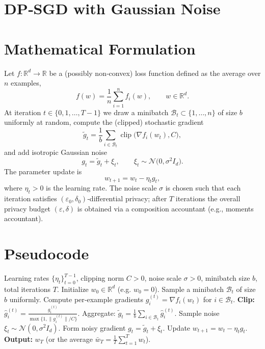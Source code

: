 \documentclass{article}
\newcommand{\R}{\mathbb{R}}
\begin{document}
\section*{DP‑SGD with Gaussian Noise}

\section*{Mathematical Formulation}
Let $f:\R^{d}\to\R$ be a (possibly non‑convex) loss function defined as the average over $n$ examples,
\[
f(w)=\frac{1}{n}\sum_{i=1}^{n} f_i(w),\qquad w\in\R^{d}.
\]
At iteration $t\in\{0,1,\dots,T-1\}$ we draw a minibatch $\mathcal{B}_t\subset\{1,\dots,n\}$ of size $b$ uniformly at random,
compute the (clipped) stochastic gradient
\[
\tilde g_t=\frac{1}{b}\sum_{i\in\mathcal{B}_t}\operatorname{clip}\!\bigl(\nabla f_i(w_t),C\bigr),
\]
and add isotropic Gaussian noise
\[
g_t=\tilde g_t+ \xi_t,\qquad \xi_t\sim\mathcal N\!\bigl(0,\sigma^{2}I_d\bigr).
\]
The parameter update is
\[
w_{t+1}=w_t-\eta_t g_t,
\]
where $\eta_t>0$ is the learning rate.  
The noise scale $\sigma$ is chosen such that each iteration satisfies $(\varepsilon_0,\delta_0)$‑differential privacy; after $T$ iterations the overall privacy budget $(\varepsilon,\delta)$ is obtained via a composition accountant (e.g., moments accountant).

\section*{Pseudocode}
\begin{algorithm}[H]
\caption{DP‑SGD with Gaussian Noise}
\begin{algorithmic}[1]
\Require Learning rates $\{\eta_t\}_{t=0}^{T-1}$, clipping norm $C>0$, noise scale $\sigma>0$, minibatch size $b$, total iterations $T$.
\State Initialize $w_0\in\R^{d}$ (e.g. $w_0=0$).
    \State Sample a minibatch $\mathcal{B}_t$ of size $b$ uniformly.
    \State Compute per‑example gradients $g_i^{(t)}=\nabla f_i(w_t)$ for $i\in\mathcal{B}_t$.
    \State \textbf{Clip:} $\displaystyle \hat g_i^{(t)}=
          \frac{g_i^{(t)}}{\max\{1,\|g_i^{(t)}\|/C\}}$.
    \State Aggregate: $\displaystyle \tilde g_t=\frac{1}{b}\sum_{i\in\mathcal{B}_t}\hat g_i^{(t)}$.
    \State Sample noise $\xi_t\sim\mathcal N(0,\sigma^{2}I_d)$.
    \State Form noisy gradient $g_t=\tilde g_t+\xi_t$.
    \State Update $w_{t+1}=w_t-\eta_t g_t$.
\EndFor
\State \textbf{Output:} $w_T$ (or the average $\bar w_T=\frac1T\sum_{t=1}^{T}w_t$).
\end{algorithmic}
\end{algorithm}
\end{document}
